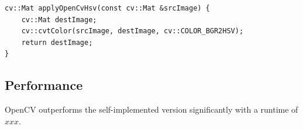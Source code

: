 \begin{listing}[H]
    \begin{verbatim}
cv::Mat applyOpenCvHsv(const cv::Mat &srcImage) {
    cv::Mat destImage;
    cv::cvtColor(srcImage, destImage, cv::COLOR_BGR2HSV);
    return destImage;
}
    \end{verbatim}
    \label{listing:hsv_opencv}
\end{listing}

\subsection{Performance}

OpenCV outperforms the self-implemented version significantly with a runtime of $ xxx $.